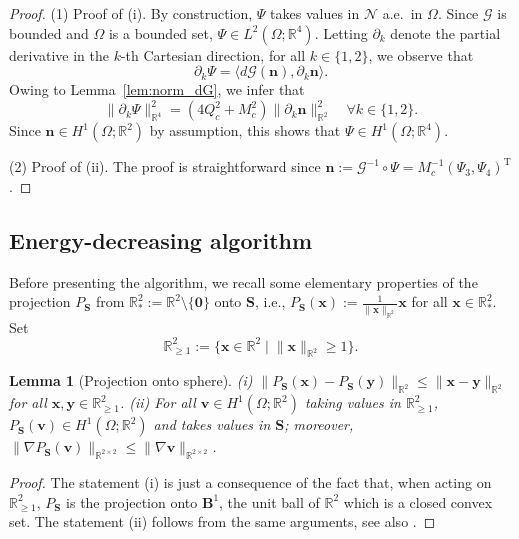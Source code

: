 \documentclass[a4paper,11pt]{article}
\newtheorem{lemma}[theorem]{Lemma}
\theoremstyle{definition}
\theoremstyle{remark}
\numberwithin{equation}{section}
\newcommand{\Real}{\mathbb{R}}
\newcommand{\bn}{{\boldsymbol n}}
\newcommand{\bv}{{\boldsymbol v}}
\newcommand{\bx}{{\boldsymbol x}}
\newcommand{\by}{{\boldsymbol y}}
\newcommand{\bB}{{\boldsymbol B}}
\newcommand{\bS}{{\boldsymbol S}}
\newcommand{\bzero}{{\boldsymbol 0}}
\newcommand{\calG}{\mathcal{G}}
\newcommand{\calN}{\mathcal{N}}
\newcommand{\tr}{^{\mathrm{T}}}
\begin{document}
\begin{proof}
(1) Proof of (i). By construction, $\Psi$ takes values in $\calN$ a.e.~in $\Omega$. Since $\calG$ is bounded and $\Omega$ is a bounded set, $\Psi \in L^2(\Omega;\Real^4)$. Letting $\partial_k$ denote the partial derivative in the $k$-th Cartesian direction, for all $k\in\{1,2\}$, we observe that 
\[
\partial_k \Psi = \langle d\calG(\bn),\partial_k\bn\rangle.
\] 
Owing to Lemma~\ref{lem:norm_dG}, we infer that 
\begin{equation} \label{eq:norm_psi}
\|\partial_k \Psi\|_{\Real^4}^2 = (4Q_c^2+M_c^2)\|\partial_k\bn\|_{\Real^2}^2 \quad \forall k\in\{1,2\}.
\end{equation} 
Since $\bn\in H^1(\Omega;\Real^2)$ by assumption, this shows that $\Psi \in H^1(\Omega;\Real^4)$.

(2) Proof of (ii). The proof is straightforward since $\bn := \calG^{-1} \circ \Psi = M_c^{-1}(\Psi_3,\Psi_4)\tr$. 
\end{proof}

\subsection{Energy-decreasing algorithm}

Before presenting the algorithm, we recall some elementary properties of the 
projection $P_{\bS}$ from $\Real^2_*:= \Real^2\setminus\{\bzero\}$ onto $\bS$, i.e.,
$P_{\bS}(\bx):= \frac{1}{\|\bx\|_{\Real^2}}\bx$ for all $\bx\in \Real^2_*$.
Set 
\begin{equation} \label{eq:outside_ball}
\Real^2_{\ge1}:=\{\bx\in\Real^2 \;|\; \|\bx\|_{\Real^2}\ge1\}.
\end{equation}

\begin{lemma}[Projection onto sphere] \label{lem:PS1}
\textup{(i)} $\|P_{\bS}(\bx)-P_{\bS}(\by)\|_{\Real^2} \le \|\bx-\by\|_{\Real^2}$ for all $\bx,\by \in \Real^2_{\ge1}$.
\textup{(ii)} For all $\bv \in H^1(\Omega;\Real^2)$ taking values in $\Real^2_{\ge1}$, $P_{\bS}(\bv) \in H^1(\Omega;\Real^2)$ and takes values in $\bS$; moreover, $\|\nabla P_{\bS}(\bv)\|_{\Real^{2\times2}} \le \|\nabla\bv\|_{\Real^{2\times2}}$. 
\end{lemma}

\begin{proof}
The statement (i) is just a consequence of the fact that, when acting on $\Real^2_{\ge1}$, $P_{\bS}$ is the projection onto $\bB^1$, the unit ball of $\Real^2$ which is a closed convex set. The statement (ii) follows from the same arguments, see also 
\cite[Prop.~1]{Alouges:1997:Harmonic_map}.
\end{proof}
\end{document}
